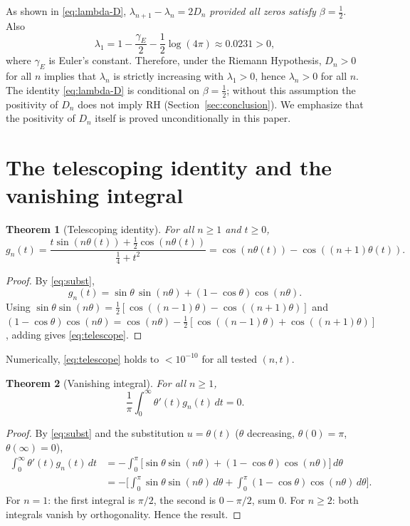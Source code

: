 \documentclass[11pt]{article}
\newtheorem{theorem}{Theorem}[section]
\begin{document}
As shown in \eqref{eq:lambda-D}, $\lambda_{n+1}-\lambda_n=2D_n$ \emph{provided all
zeros satisfy $\beta=\tfrac12$}. Also
\begin{equation*}
\lambda_1=1-\frac{\gamma_E}{2}-\frac12\log(4\pi)\approx0.0231>0,
\end{equation*}
where $\gamma_E$ is Euler's constant. Therefore, under the Riemann Hypothesis,
$D_n>0$ for all $n$ implies that $\lambda_n$ is strictly increasing with
$\lambda_1>0$, hence $\lambda_n>0$ for all $n$. The identity \eqref{eq:lambda-D}
is conditional on $\beta=\tfrac12$; without this assumption the positivity of $D_n$
does not imply RH (Section~\ref{sec:conclusion}). We emphasize that the positivity
of $D_n$ itself is proved unconditionally in this paper.

\section{The telescoping identity and the vanishing integral}
\label{sec:telescope}

\begin{theorem}[Telescoping identity]
\label{thm:telescope}
For all $n\ge1$ and $t\ge0$,
\begin{equation}\label{eq:telescope}
g_n(t)=\frac{t\sin(n\theta(t))+\tfrac12\cos(n\theta(t))}{\tfrac14+t^2}
=\cos(n\theta(t))-\cos((n+1)\theta(t)).
\end{equation}
\end{theorem}

\begin{proof}
By \eqref{eq:subst},
\[
g_n(t)=\sin\theta\,\sin(n\theta)+(1-\cos\theta)\cos(n\theta).
\]
Using $\sin\theta\sin(n\theta)=\tfrac12[\cos((n-1)\theta)-\cos((n+1)\theta)]$ and
$(1-\cos\theta)\cos(n\theta)=\cos(n\theta)-\tfrac12[\cos((n-1)\theta)+\cos((n+1)\theta)]$,
adding gives \eqref{eq:telescope}.
\end{proof}

Numerically, \eqref{eq:telescope} holds to $<10^{-10}$ for all tested $(n,t)$.

\begin{theorem}[Vanishing integral]
\label{thm:vanishing}
\label{sec:vanishing}
For all $n\ge1$,
\begin{equation*}
\frac1\pi\int_0^\infty\theta'(t)g_n(t)\,dt=0.
\end{equation*}
\end{theorem}

\begin{proof}
By \eqref{eq:subst} and the substitution $u=\theta(t)$ ($\theta$ decreasing, $\theta(0)=\pi$, $\theta(\infty)=0$),
\begin{align*}
\int_0^\infty\theta'(t)g_n(t)\,dt
&=-\int_0^\pi\big[\sin\theta\sin(n\theta)+(1-\cos\theta)\cos(n\theta)\big]\,d\theta\\
&=-\Big[\int_0^\pi\sin\theta\sin(n\theta)\,d\theta+\int_0^\pi(1-\cos\theta)\cos(n\theta)\,d\theta\Big].
\end{align*}
For $n=1$: the first integral is $\pi/2$, the second is $0-\pi/2$, sum $0$. For $n\ge2$:
both integrals vanish by orthogonality. Hence the result.
\end{proof}
\end{document}
